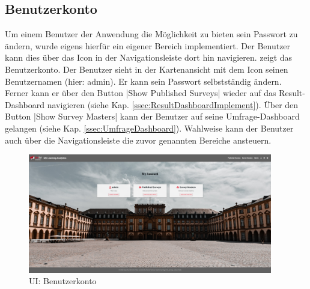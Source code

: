 
\subsection{Benutzerkonto}
\label{ssec:Benutzerkonto}

Um einem Benutzer der Anwendung die Möglichkeit zu bieten sein Passwort zu ändern, wurde eigens hierfür ein eigener Bereich implementiert.
Der Benutzer kann dies über das Icon \faUser[regular]\xspace in der Navigationsleiste dort hin navigieren.
\abb {} zeigt das Benutzerkonto. \newline
Der Benutzer sieht in der Kartenansicht mit dem Icon \faUser[regular]\xspace seinen Benutzernamen (hier: admin).
Er kann sein Passwort selbstständig ändern.\newline
Ferner kann er über den Button \jinline|Show Published Surveys| wieder auf das Result-Dashboard navigieren (siehe Kap. \vref{ssec:ResultDashboardImplement}).
Über den Button \jinline|Show Survey Masters| kann der Benutzer auf seine Umfrage-Dashboard gelangen (siehe Kap. \vref{ssec:UmfrageDashboard}). 
Wahlweise kann der Benutzer auch über die Navigationsleiste die zuvor genannten Bereiche ansteuern.

\begin{figure}[hp]
	\centering
	\includegraphics[width=0.95\textwidth, keepaspectratio]{img/client/Account.png}
	\captionsetup{justification=centering, format=plain}
	\caption[\acf{UI}: Benutzerkonto]{\acf{UI}: Benutzerkonto \\ \quelleScreenshot}
	\label{fig:AccountImplement}
\end{figure}


